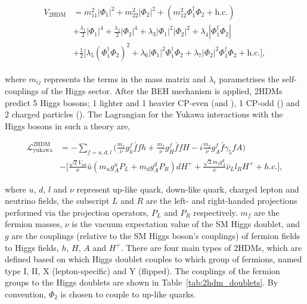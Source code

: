 \begin{align}
\label{eqn:lag_2hdm}
\begin{split}
V_{\text{2HDM}} &= m_{11}^{2}|\Phi_{1}|^2 + m_{22}^{2}|\Phi_{2}|^2 + (m_{12}^{2}\Phi_{1}^{\dagger}\Phi_{2} + \text{h.c.}) \\
&+ \frac{\lambda_1}{2}|\Phi_{1}|^4 + \frac{\lambda_2}{2}|\Phi_{2}|^4 + \lambda_3 |\Phi_{1}|^2 |\Phi_{2}|^2 + \lambda_4  |\Phi_{1}^{\dagger} \Phi_{2}| \\
&+ \frac{1}{2}\Big[ \lambda_5 (\Phi_{1}^{\dagger} \Phi_{2})^{2} + \lambda_6 |\Phi_{1}|^{2} \Phi_{1}^{\dagger} \Phi_{2} +  \lambda_7 |\Phi_{2}|^{2} \Phi_{1}^{\dagger} \Phi_{2} + \text{h.c.} \Big],
\end{split}
\end{align}

where $m_{ij}$ represents the terms in the mass matrix and $\lambda_i$ parametrises the self-couplings of the Higgs sector. 
After the \ac{BEH} mechanism is applied, \ac{2HDM}s predict 5 Higgs bosons; 1 lighter and 1 heavier \ac{CP}-even (\Ph and \PH), 1 \ac{CP}-odd (\PA) and 2 charged particles (\PHc).
The Lagrangian for the Yukawa interactions with the Higgs bosons in such a theory are,

\begin{equation}
\begin{aligned}
\mathcal{L}^{\text{2HDM}}_{\text{yukawa}} &= - \sum_{f=u,d,l}\Big(\frac{m_{f}}{\nu}g^{f}_{h}\bar{f}fh + \frac{m_{f}}{\nu}g^{f}_{H}\bar{f}fH -i\frac{m_{f}}{\nu}g^{f}_{A}\bar{f}\gamma_{5}fA\Big)  \\ 
&- \Big[\frac{\sqrt{2}V_{ud}}{\nu}\bar{u}(m_{u}g^{u}_{A}P_{L} + m_{d}g^{d}_{A}P_{R})dH^{+} + \frac{\sqrt{2}m_{l}g^{d}_{A}}{\nu}\bar{\nu}_{L}l_{R}H^{+} + h.c.\Big],
\end{aligned}
\end{equation}

where $u$, $d$, $l$ and $\nu$ represent up-like quark, down-like quark, charged lepton and neutrino fields, the subscript $L$ and $R$ are the left- and right-handed projections performed via the projection operators, $P_L$ and $P_R$ respectively.
$m_{f}$ are the fermion masses, $\nu$ is the vacuum expectation value of the \ac{SM} Higgs doublet, and $g$ are the couplings (relative to the \ac{SM} Higgs boson's couplings) of fermion fields to Higgs fields, $h$, $H$, $A$ and $H^{+}$.
There are four main types of \ac{2HDM}s, which are defined based on which Higgs doublet couples to which group of fermions, named type I, II, X (lepton-specific) and Y (flipped).
The couplings of the fermion groups to the Higgs doublets are shown in Table~\ref{tab:2hdm_doublets}. 
By convention, $\Phi_2$ is chosen to couple to up-like quarks.

